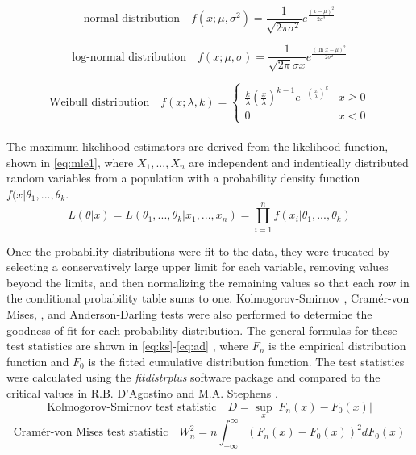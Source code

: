 \begin{equation}
  \label{eq:normal}
  \mbox{normal distribution} \quad f(x; \mu, \sigma^{2}) = \frac{1}{\sqrt{2 \pi \sigma^{2}}} e^{\frac{(x - \mu)^{2}}{2 \sigma^{2}}}
\end{equation}

\begin{equation}
  \label{eq:log-normal}
  \mbox{log-normal distribution} \quad f(x; \mu, \sigma) = \frac{1}{\sqrt{2 \pi} \sigma x} e^{\frac{(\ln x - \mu)^{2}}{2 \sigma^{2}}}
\end{equation}

\begin{equation}
  \label{eq:weibull}
  \mbox{Weibull distribution} \quad f(x; \lambda, k) =
  \begin{cases}
    \frac{k}{\lambda} (\frac{x}{\lambda})^{k - 1} e^{-(\frac{x}{\lambda})^{k}} & x \geq 0 \\
    0 & x < 0
  \end{cases}
\end{equation}
\\
\noindent The maximum likelihood estimators are derived from the likelihood function, shown in \ref{eq:mle1}, where $X_{1}, ..., X_{n}$ are independent and indentically distributed random variables from a population with a probability density function $f(x | \theta_{1}, ..., \theta_{k}$.
%
\begin{equation}
  \label{eq:mle1}
  L(\theta | x) = L(\theta_{1}, ..., \theta_{k} | x_{1}, ..., x_{n}) = \prod_{i = 1}^{n} f(x_{i} | \theta_{1}, ..., \theta_{k})
\end{equation}

\noindent 

Once the probability distributions were fit to the data, they were trucated by selecting a conservatively large upper limit for each variable, removing values beyond the limits, and then normalizing the remaining values so that each row in the conditional probability table sums to one.
Kolmogorov-Smirnov \cite{massey}, Cram\'{e}r-von Mises, \cite{cramer}, and Anderson-Darling \cite{anderson} tests were also performed to determine the goodness of fit for each probability distribution.
The general formulas for these test statistics are shown in \ref{eq:ks}-\ref{eq:ad} \cite{anderson,cramer,massey}, where $F_{n}$ is the empirical distribution function and $F_{0}$ is the fitted cumulative distribution function.
The test statistics were calculated using the \textit{fitdistrplus} \cite{fitdistrplus} software package and compared to the critical values in R.B. D'Agostino and M.A. Stephens \cite{d'agostino}.
%
\begin{equation}
  \label{eq:ks}
  \mbox{Kolmogorov-Smirnov test statistic} \quad D = \sup_{x} | F_{n}(x) - F_{0}(x) |
\end{equation}
\vspace{+0.4cm}
\begin{equation}
  \label{eq:cvm}
  \mbox{Cram\'{e}r-von Mises test statistic} \quad W_{n}^{2} = n \int_{-\infty}^{\infty} (F_{n}(x) - F_{0}(x))^2 dF_{0}(x)
\end{equation}

